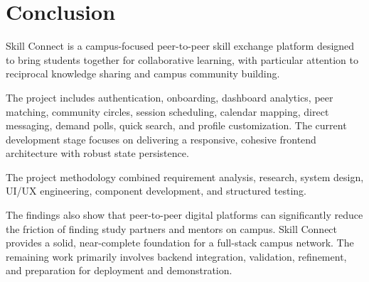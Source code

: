 \documentclass[12pt,a4paper]{report}
\begin{document}
\chapter{Conclusion}

Skill Connect is a campus-focused peer-to-peer skill exchange platform designed to bring students together for collaborative learning, with particular attention to reciprocal knowledge sharing and campus community building.

The project includes authentication, onboarding, dashboard analytics, peer matching, community circles, session scheduling, calendar mapping, direct messaging, demand polls, quick search, and profile customization. The current development stage focuses on delivering a responsive, cohesive frontend architecture with robust state persistence.

The project methodology combined requirement analysis, research, system design, UI/UX engineering, component development, and structured testing.

The findings also show that peer-to-peer digital platforms can significantly reduce the friction of finding study partners and mentors on campus. Skill Connect provides a solid, near-complete foundation for a full-stack campus network. The remaining work primarily involves backend integration, validation, refinement, and preparation for deployment and demonstration.
\end{document}
